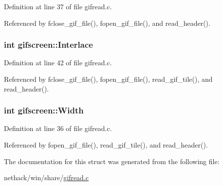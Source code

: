 Definition at line 37 of file gifread.\+c.



Referenced by fclose\+\_\+gif\+\_\+file(), fopen\+\_\+gif\+\_\+file(), and read\+\_\+header().

\hypertarget{structgifscreen_a04416bc477001625456cccef080acab7}{
\subsubsection[{Interlace}]{\setlength{\rightskip}{0pt plus 5cm}int gifscreen\+::\+Interlace}}\label{structgifscreen_a04416bc477001625456cccef080acab7}


Definition at line 42 of file gifread.\+c.



Referenced by fclose\+\_\+gif\+\_\+file(), fopen\+\_\+gif\+\_\+file(), read\+\_\+gif\+\_\+tile(), and read\+\_\+header().

\hypertarget{structgifscreen_a3079f5759d42a6edb5720f143dac5e97}{
\subsubsection[{Width}]{\setlength{\rightskip}{0pt plus 5cm}int gifscreen\+::\+Width}}\label{structgifscreen_a3079f5759d42a6edb5720f143dac5e97}


Definition at line 36 of file gifread.\+c.



Referenced by fopen\+\_\+gif\+\_\+file(), read\+\_\+gif\+\_\+tile(), and read\+\_\+header().



The documentation for this struct was generated from the following file\+:\begin{DoxyCompactItemize}
\item 
nethack/win/share/\hyperlink{gifread_8c}{gifread.\+c}\end{DoxyCompactItemize}
